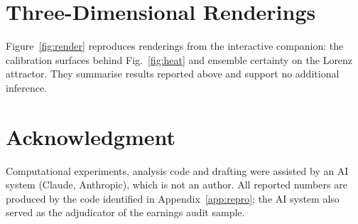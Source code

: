 \documentclass[journal]{IEEEtran}
\theoremstyle{definition}
\begin{document}
\section{Three-Dimensional Renderings}\label{app:render}
Figure~\ref{fig:render} reproduces renderings from the interactive companion: the calibration surfaces behind Fig.~\ref{fig:heat} and ensemble certainty on the Lorenz attractor. They summarise results reported above and support no additional inference.


\section*{Acknowledgment}
Computational experiments, analysis code and drafting were assisted by an AI system (Claude, Anthropic), which is not an author. All reported numbers are produced by the code identified in Appendix~\ref{app:repro}; the AI system also served as the adjudicator of the earnings audit sample.



\end{document}
